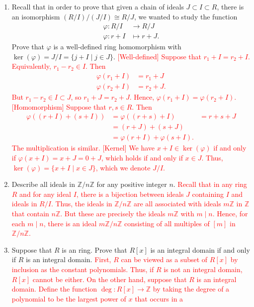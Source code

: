 \documentclass[12pt]{article}
\newcommand{\bbZ}{\mathbb{Z}}
\newcommand{\solution}[1]{\textcolor{red}{#1}}
\begin{document}
\pagestyle{fancy}


\begin{enumerate}
\item Recall that in order to prove that given a chain of ideals
  $J\subset I \subset R$, there is an isomorphism $(R/I)/(J/I)\cong
  R/J$, we wanted to study the function
  \begin{align*}
    \varphi: R/I &\rightarrow R/J\\
    \varphi: r+I &\mapsto r+J.
  \end{align*}
Prove that $\varphi$ is a well-defined ring homomorphism with
$\ker(\varphi)=J/I =\{j+I\mid j\in J\}$. 
\solution{
[Well-defined] Suppose that $r_1+I=r_2+I$. Equivalently, $r_1-r_2\in
I$. Then
\begin{align*}
  \varphi(r_1+I) &= r_1+J\\
  \varphi(r_2+I)&= r_2+J.
\end{align*}
But $r_1-r_2\in I\subset J$, so $r_1+J=r_2+J$. Hence,
$\varphi(r_1+I)=\varphi(r_2+I)$. 
[Homomorphism] Suppose that $r,s\in R$. Then
\begin{align*}
  \varphi((r+I)+(s+I)) &= \varphi((r+s)+I) \
&= r+s+J\\
&= (r+J)+(s+J)\\
&= \varphi(r+I)+\varphi(s+I).
\end{align*}
The multiplication is similar. 
[Kernel] We have $x+I\in \ker(\varphi)$ if and only if
$\varphi(x+I)=x+J=0+J$, which holds if and only if $x\in J$. Thus,
$\ker(\varphi)=\{x+I \mid x\in J\}$, which we denote $J/I$.
}
\item Describe all ideals in $\bbZ/n\bbZ$ for any positive integer
  $n$. 
\solution{
Recall that in any ring $R$ and for any ideal $I$, there is a
bijection between ideals $J$ containing $I$ and ideals in $R/I$. Thus,
the ideals in $\bbZ/n\bbZ$ are all associated with ideals $m\bbZ$ in
$\bbZ$ that contain $n\bbZ$. But these are precisely the ideals
$m\bbZ$ with $m\mid n$. Hence, for each $m\mid n$, there is an ideal
$m\bbZ/n\bbZ$ consisting of all multiples of $[m]$ in $\bbZ/n\bbZ$.}
\item Suppose that $R$ is an ring. Prove that $R[x]$ is an integral
  domain if and only if $R$ is an integral domain.
\solution{
First, $R$ can be viewed as a subset of $R[x]$ by inclusion as the
constant polynomials. Thus, if $R$ is not an integral domain, $R[x]$
cannot be either. On the other hand, suppose that $R$ is an integral
domain. Define the function $\deg: R[x]\rightarrow \bbZ$ by taking the
degree of a polynomial to be the largest power of $x$ that occurs in a
}
\end{enumerate}
\end{document}
